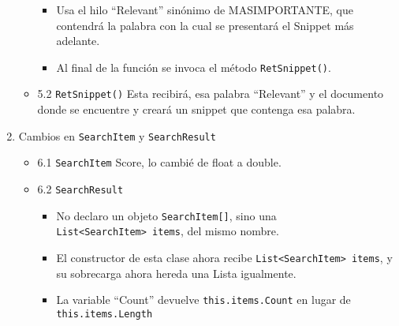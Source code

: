 \begin{enumerate}
\begin{itemize}
    \begin{itemize}
    \tightlist
    \item
      Usa el hilo ``Relevant'' sinónimo de MASIMPORTANTE, que contendrá
      la palabra con la cual se presentará el Snippet más adelante.
    \item
      Al final de la función se invoca el método \texttt{RetSnippet()}.
    \end{itemize}
  \item
    5.2 \texttt{RetSnippet()} Esta recibirá, esa palabra ``Relevant'' y
    el documento donde se encuentre y creará un snippet que contenga esa
    palabra.
  \end{itemize}
\item
  Cambios en \texttt{SearchItem} y \texttt{SearchResult}

  \begin{itemize}
  \tightlist
  \item
    6.1 \texttt{SearchItem} Score, lo cambié de float a double.
  \item
    6.2 \texttt{SearchResult}

    \begin{itemize}
    \tightlist
    \item
      No declaro un objeto \texttt{SearchItem{[}{]}}, sino una
      \texttt{List\textless{}SearchItem\textgreater{}\ items}, del mismo
      nombre.
    \item
      El constructor de esta clase ahora recibe
      \texttt{List\textless{}SearchItem\textgreater{}\ items}, y su
      sobrecarga ahora hereda una Lista igualmente.
    \item
      La variable ``Count'' devuelve \texttt{this.items.Count} en lugar
      de \texttt{this.items.Length}
    \end{itemize}
  \end{itemize}

\begin{Shaded}
\begin{Highlighting}[]
 
\OperatorTok{\{}
\OperatorTok{{-}}\OperatorTok{\textless{}}\OperatorTok{\textgreater{}}\OperatorTok{;{-}}

 \OperatorTok{({-}{-}}\OperatorTok{\textless{}}\OperatorTok{\textgreater{}{-}{-}}\OperatorTok{,} \OperatorTok{=}\OperatorTok{)}
\OperatorTok{\{}
     \OperatorTok{(}\OperatorTok{==} \OperatorTok{)} \OperatorTok{\{}
          \OperatorTok{(}\OperatorTok{);}
    \OperatorTok{\}}


\end{Highlighting}
\end{Shaded}
\end{enumerate}
